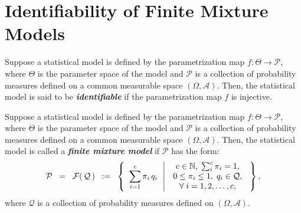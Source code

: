 

\section{Identifiability of Finite Mixture Models}
\setcounter{theorem}{0}
\setcounter{equation}{0}

\renewcommand{\theenumi}{\roman{enumi}}
\renewcommand{\labelenumi}{\textnormal{(\theenumi)}$\;\;$}

\begin{definition}
\mbox{}\vskip 0.05cm
\noindent
Suppose a statistical model is defined by the parametrization map
$f : \Theta \longrightarrow \mathcal{P}$,
where $\Theta$ is the parameter space of the model and
$\mathcal{P}$ is a collection of probability measures
defined on a common measurable space $\left(\Omega,\mathcal{A}\right)$.
Then, the statistical model is said to be \textbf{\emph{identifiable}} if
the parametrization map $f$ is injective.
\end{definition}

\begin{definition}
\mbox{}\vskip 0.05cm
\noindent
Suppose a statistical model is defined by the parametrization map
$f : \Theta \longrightarrow \mathcal{P}$,
where $\Theta$ is the parameter space of the model and
$\mathcal{P}$ is a collection of probability measures
defined on a common measurable space $\left(\Omega,\mathcal{A}\right)$.
Then, the statistical model is called a \textbf{\emph{finite mixture model}} if
$\mathcal{P}$ has the form:
\begin{equation*}
\mathcal{P}
\;\; = \;\;
\mathcal{F}\!\left(\,\mathcal{Q}\,\right)
\;\; := \;\;
\left\{\;\;
	\overset{c}{\underset{i=1}{\sum}}\,\pi_{i}\,q_{i}
	\,\;\left\vert\,\;
	\begin{array}{c}
		c \in \mathbb{N}, \; \sum_{i}^{c}\pi_{i} = 1, \\
		0 \leq \pi_{i} \leq 1, \; q_{i} \in \mathcal{Q}, \\
		\forall\;i = 1,2,\ldots,c,
	\end{array}
	\right.
\;\right\},
\end{equation*}
where $\mathcal{Q}$ is a collection of probability measures defined on
$\left(\Omega,\mathcal{A}\right)$.
\end{definition}

